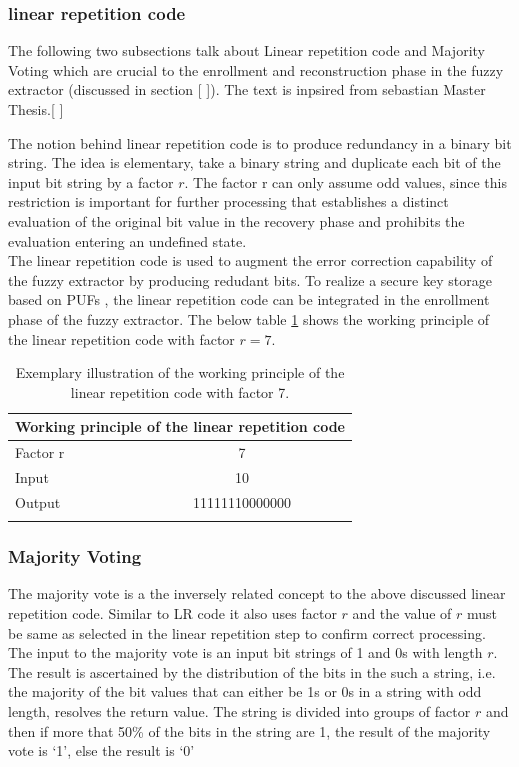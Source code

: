 \subsubsection{linear repetition code}
\label{fzex_lr}
The following two subsections talk about Linear repetition code and Majority Voting which are crucial to the enrollment and reconstruction phase in the fuzzy extractor (discussed in section [ ]). The text is inpsired from sebastian Master Thesis.[ ]

The notion behind linear repetition code is to produce redundancy in a binary bit string. The idea is elementary, take a binary string and duplicate each bit of the input bit string by a factor $r$. The factor r can only assume odd values, since this restriction is important for further processing that establishes a distinct evaluation of the original bit value in the recovery phase and prohibits the evaluation entering an undefined state.\\

The linear repetition code is used to augment the error correction capability of the fuzzy extractor by producing redudant bits. To realize a secure key storage based on PUFs , the linear repetition code can be integrated in the enrollment phase of the fuzzy extractor. The below table \ref{lr} shows the working principle of the linear repetition code with factor $r = 7$.

\begin{table}[!ht]
\begin{center}
\begin{tabular}{lc}
\toprule
\multicolumn{2}{c}{\textbf{Working principle of the linear repetition code}}\\
\midrule
Factor r & 7\\
Input & 10\\
Output & 11111110000000\\
\addlinespace
\bottomrule
\end{tabular}
\end{center}
\caption{Exemplary illustration of the working principle of the linear repetition code with factor 7.}
\label{lr}
\end{table}

\subsubsection{Majority Voting}
\label{fzex_mv}
The majority vote is a the inversely related concept to the above discussed linear repetition code. Similar to LR code it also uses factor $r$ and the value of $r$ must be same as selected in the linear repetition step to confirm correct processing. The input to the majority vote is an input bit strings of 1 and 0s with length $r$. The result is ascertained by the distribution of the bits in the such a string, i.e. the majority of the bit values that can either be 1s or 0s in a string with odd
length, resolves the return value. The string is divided into groups of factor $r$ and then if more that 50\% of the bits in the string are 1, the result of the majority vote is `1', else the result is `0'\\

